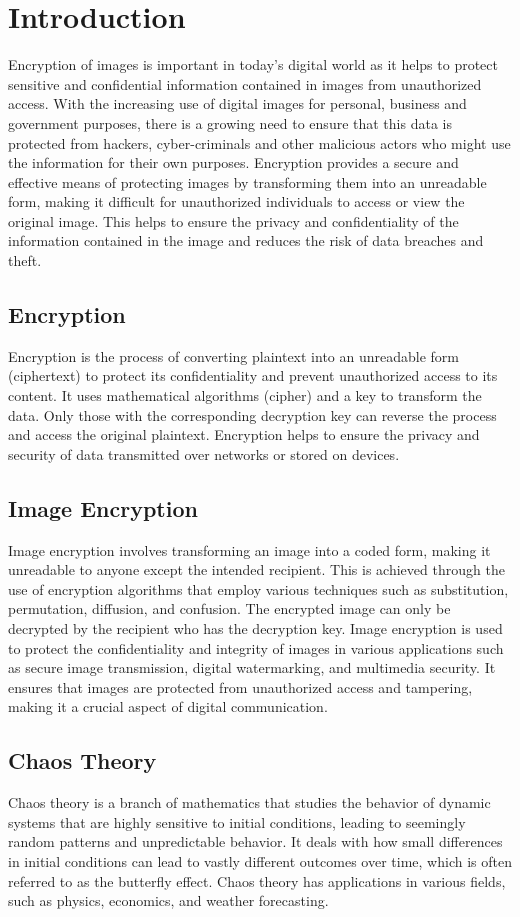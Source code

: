 \documentclass[12pt,a4paper,english]{article}
\begin{document}
\section{Introduction}
Encryption of images is important in today's digital world as it helps to protect sensitive and confidential information contained in images from unauthorized access. With the increasing use of digital images for personal, business and government purposes, there is a growing need to ensure that this data is protected from hackers, cyber-criminals and other malicious actors who might use the information for their own purposes. Encryption provides a secure and effective means of protecting images by transforming them into an unreadable form, making it difficult for unauthorized individuals to access or view the original image. This helps to ensure the privacy and confidentiality of the information contained in the image and reduces the risk of data breaches and theft.
\subsection{Encryption}
Encryption is the process of converting plaintext into an unreadable form (ciphertext) to protect its confidentiality and prevent unauthorized access to its content. It uses mathematical algorithms (cipher) and a key to transform the data. Only those with the corresponding decryption key can reverse the process and access the original plaintext. Encryption helps to ensure the privacy and security of data transmitted over networks or stored on devices.
\subsection{Image Encryption}
Image encryption involves transforming an image into a coded form, making it unreadable to anyone except the intended recipient. This is achieved through the use of encryption algorithms that employ various techniques such as substitution, permutation, diffusion, and confusion. The encrypted image can only be decrypted by the recipient who has the decryption key. Image encryption is used to protect the confidentiality and integrity of images in various applications such as secure image transmission, digital watermarking, and multimedia security. It ensures that images are protected from unauthorized access and tampering, making it a crucial aspect of digital communication.
\subsection{Chaos Theory}
Chaos theory is a branch of mathematics that studies the behavior of dynamic systems that are highly sensitive to initial conditions, leading to seemingly random patterns and unpredictable behavior. It deals with how small differences in initial conditions can lead to vastly different outcomes over time, which is often referred to as the butterfly effect. Chaos theory has applications in various fields, such as physics, economics, and weather forecasting.
\end{document}
